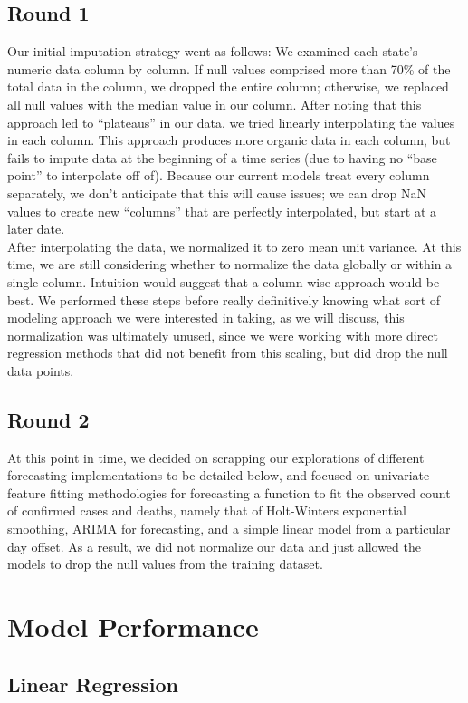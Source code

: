 \documentclass[sigconf,nonacm]{acmart}
\begin{document}
\subsection{Round 1}
Our initial imputation strategy went as follows: 
We examined each state’s numeric data column by column. If null values comprised more than 70\% of the total data in the column, 
we dropped the entire column; otherwise, we replaced all null values with the median value in our column. 
After noting that this approach led to “plateaus” in our data, we tried linearly interpolating the values in each column. 
This approach produces more organic data in each column, but fails to impute data at the beginning of a time series 
(due to having no “base point” to interpolate off of). Because our current models treat every column separately, 
we don’t anticipate that this will cause issues; we can drop NaN values to create new “columns” that are perfectly interpolated, but start at a later date.  
\\
After interpolating the data, we normalized it to zero mean unit variance. 
At this time, we are still considering whether to normalize the data globally or within a single column. 
Intuition would suggest that a column-wise approach would be best. We performed these steps before really definitively knowing 
what sort of modeling approach we were interested in taking, as we will discuss, this normalization was ultimately unused, 
since we were working with more direct regression methods that did not benefit from this scaling, but did drop the null data points.

\subsection{Round 2}
At this point in time, we decided on scrapping our explorations of different forecasting implementations to be detailed below, 
and focused on univariate feature fitting methodologies for forecasting a function to fit the observed count of confirmed cases and deaths, 
namely that of Holt-Winters exponential smoothing, ARIMA for forecasting, and a simple linear model from a particular day offset. 
As a result, we did not normalize our data and just allowed the models to drop the null values from the training dataset.

\section{Model Performance}
\subsection{Linear Regression}
\end{document}
